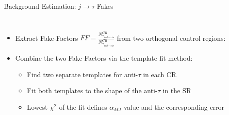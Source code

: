 \documentclass[aspectratio=169,xcolor=table]{beamer}
\begin{document}
    \begin{frame}[t]{Background Estimation: $j \rightarrow \tau$ Fakes}
      \begin{columns}[t]
        \vspace{-3.5cm}
        \begin{itemize}
          \item Extract Fake-Factors $FF = \frac{N^{CR}_{\tau_{had-vis}}}{N^{CR}_{\bar{\tau}_{had-vis}}}$ from two orthogonal control regions:
            \begin{table}
              \tiny
            \end{table}
          \item Combine the two Fake-Factors via the template fit method:
          \begin{itemize}
            \item Find two separate templates for anti-$\tau$ in each CR
            \item Fit both templates to the shape of the anti-$\tau$ in the SR
            \item Lowest $\chi^2$ of the fit defines $\alpha_{MJ}$ value and the corresponding error
          \end{itemize}
        \end{itemize}

\end{columns}
\end{frame}
\end{document}

